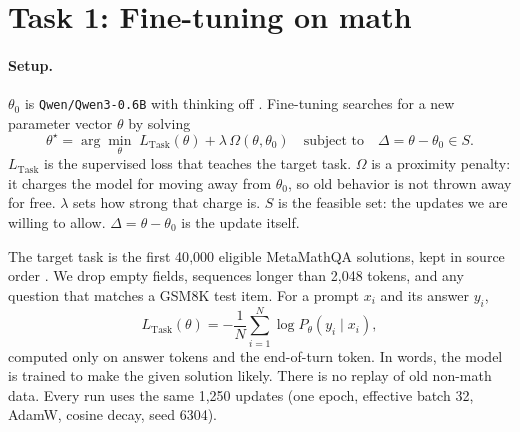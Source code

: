 \documentclass[10pt]{article}
\begin{document}
\section{Task 1: Fine-tuning on math}
\label{sec:ft}

\paragraph{Setup.}
$\theta_0$ is \texttt{Qwen/Qwen3-0.6B} with thinking off \cite{qwen3}.
Fine-tuning searches for a new parameter vector $\theta$ by solving
\begin{equation}
\theta^{\star}
=\arg\min_{\theta}
\;
L_{\mathrm{Task}}(\theta)+\lambda\,\Omega(\theta,\theta_0)
\quad\text{subject to}\quad
\Delta=\theta-\theta_0\in S.
\label{eq:ft}
\end{equation}
$L_{\mathrm{Task}}$ is the supervised loss that teaches the target task.
$\Omega$ is a proximity penalty: it charges the model for moving away from $\theta_0$, so old behavior is not thrown away for free.
$\lambda$ sets how strong that charge is.
$S$ is the feasible set: the updates we are willing to allow.
$\Delta=\theta-\theta_0$ is the update itself.

The target task is the first 40{,}000 eligible MetaMathQA solutions, kept in source order \cite{yu2024metamath}.
We drop empty fields, sequences longer than 2{,}048 tokens, and any question that matches a GSM8K test item.
For a prompt $x_i$ and its answer $y_i$,
\begin{equation}
L_{\mathrm{Task}}(\theta)
=-\frac1N\sum_{i=1}^{N}\log P_{\theta}(y_i\mid x_i),
\label{eq:ltask}
\end{equation}
computed only on answer tokens and the end-of-turn token.
In words, the model is trained to make the given solution likely.
There is no replay of old non-math data.
Every run uses the same 1{,}250 updates (one epoch, effective batch 32, AdamW, cosine decay, seed 6304).
\end{document}
